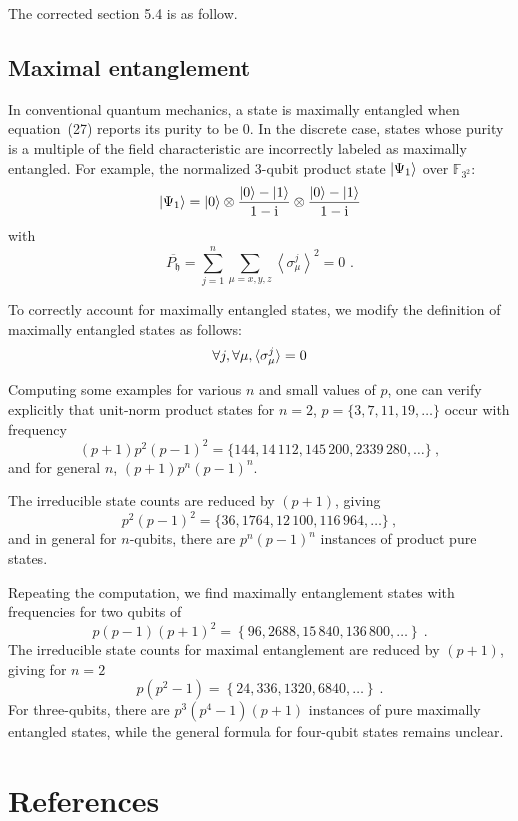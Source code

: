 \documentclass{iopart}
\newcommand{\ff}[1]{\mathbb{F}_{#1}}
\def\fh{\mathfrak{h}}
\begin{document}
The corrected section 5.4 is as follow.


\subsection{Maximal entanglement}

In conventional quantum mechanics, a state is maximally entangled
when equation~(27) reports its purity to be 0. In the discrete case,
states whose purity is a multiple of the field characteristic are
incorrectly labeled as maximally entangled. For example, the normalized
3-qubit product state $\ket{\Psi_{1}}$ over $\ff{3^{2}}$: 
\[
\ket{\Psi_{1}}=\ket{0}\otimes\frac{\ket{0}-\ket{1}}{1-\mathrm{i}}\otimes\frac{\ket{0}-\ket{1}}{1-\mathrm{i}}
\]
with 
\[
\overline{P_{\fh}}=\sum_{j=1}^{n}\sum_{\mu=x,y,z}\left\langle \sigma_{\mu}^{j}\right\rangle ^{2}=0\textrm{ .}
\]


To correctly account for maximally entangled states, we modify the
definition of maximally entangled states as follows:
\[
\forall j,\forall\mu,\braket{\sigma_{\mu}^{j}}=0
\]


Computing some examples for various $n$ and small values of $p$,
one can verify explicitly that unit-norm product states for $n=2$,
$p=\{3,7,11,19,\ldots\}$ occur with frequency 
\[
(p+1)p^{2}(p-1)^{2}=\{144,14\,112,145\,200,2339\,280,\ldots\}\ ,
\]
and for general $n$, $(p+1)p^{n}(p-1)^{n}$.

The irreducible state counts are reduced by $(p+1)$, giving 
\[
p^{2}(p-1)^{2}=\{36,1764,12\,100,116\,964,\ldots\}\ ,
\]
and in general for $n$-qubits, there are $p^{n}\left(p-1\right)^{n}$
instances of product pure states.

Repeating the computation, we find maximally entanglement states with
frequencies for two qubits of 
\[
p\left(p-1\right)\left(p+1\right)^{2}=\left\{ 96,2688,15\,840,136\,800,\ldots\right\} \ .
\]
The irreducible state counts for maximal entanglement are reduced
by $\left(p+1\right)$, giving for $n=2$ 
\[
p\left(p^{2}-1\right)=\left\{ 24,336,1320,6840,\ldots\right\} \ .
\]
For three-qubits, there are $p^{3}\left(p^{4}-1\right)\left(p+1\right)$
instances of pure maximally entangled states, while the general formula
for four-qubit states remains unclear.



\section*{References}

{}



\end{document}
